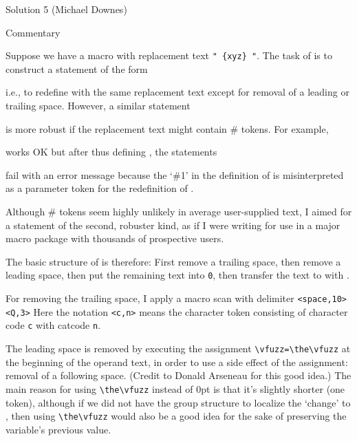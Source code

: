 \begin{solution}{Solution 5 (Michael Downes)}
\begin{lcode}
\end
\end{lcode}

Commentary

Suppose we have a macro \cmd{\x} with replacement text \verb?" {xyz} "?. 
The task of
\cmd{\trimspaces} is to construct a statement of the form
\begin{lcode}
  \def\x{{xyz}}
\end{lcode}
i.e., to redefine \cmd{\x} with the same replacement text except for removal
of a leading or trailing space. However, a similar statement
\begin{lcode}
  \edef{}
\end{lcode}
is more robust if the replacement text might contain \# tokens. For
example,
\begin{lcode}
  \def\x{\def\y##1{}}
\end{lcode}
works OK but after thus defining \cmd{\x}, the statements
\begin{lcode}
  \def\trimx#1{\expandafter\def\expandafter\x\expandafter{#1}}
  \trimx\x
\end{lcode}
fail with an error message because the `\#1' in the definition of \cmd{\y} is
misinterpreted as a parameter token for the redefinition of \cmd{\x}.

Although \# tokens seem highly unlikely in average user-supplied text, I
aimed for a statement of the second, robuster kind, as if I were writing
\cmd{\trimspaces} for use in a major macro package with thousands of
prospective users.

The basic structure of \cmd{\trimspaces} is therefore: First remove a trailing
space, then remove a leading space, then put the remaining text into
\cmd{\toks}\texttt{0}, then transfer the text to \cmd{\x} with \cmd{\edef}.

For removing the trailing space, I apply a macro scan with delimiter
\verb?<space,10><Q,3>? Here the notation \verb?<c,n>? means the character token
consisting of character code \texttt{c} with catcode \texttt{n}.

The leading space is removed by executing the assignment
\verb?\vfuzz=\the\vfuzz? at the beginning of the operand text, in order to use
a side effect of the assignment: removal of a following space.  (Credit
to Donald Arseneau for this good idea.) The main reason for using
\verb?\the\vfuzz? instead of 0pt is that it's slightly shorter (one token),
although if we did not have the group structure to localize the `change'
to \cmd{\vfuzz}, then using \verb?\the\vfuzz? would also be a good idea for the
sake of preserving the variable's previous value.


\end{solution}
